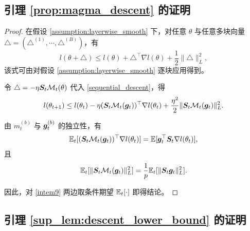 \documentclass[11pt, a4paper, twocolumn, copyright, goog]{google}
\theoremstyle{plain}
\theoremstyle{definition}
\theoremstyle{remark}
\begin{document}
\subsection{引理 \ref{prop:magma_descent} 的证明}
\begin{proof}
    
    在假设 \ref{assumption:layerwise_smooth} 下，对任意 $\theta$ 与任意多块向量 $\triangle = (\triangle^{(1)}, \cdots, \triangle^{(B)})$，有
    \begin{equation} \label{sequential_descent}
        l(\theta + \triangle) \leq l(\theta) + \triangle^\top \nabla l(\theta) + \frac{1}{2} \| \triangle \|_L^2,
    \end{equation}
    该式可由对假设 \ref{assumption:layerwise_smooth} 逐块应用得到。


    令 $\triangle = -\eta {\bm{S}}_t {\mathcal{M}}_t(\theta)$ 代入 \eqref{sequential_descent}，得
    \begin{equation} \label{intem9}
        l(\theta_{t+1})
            \leq l(\theta_t) - \eta ({\bm{S}}_t {\mathcal{M}}_t({\bm{g}}_t))^\top \nabla l(\theta_t) + \frac{\eta^2}{2} \| {\bm{S}}_t {\mathcal{M}}_t({\bm{g}}_t) \|_L^2.
    \end{equation}
    
    由 $m_{t}^{(b)}$ 与 ${\bm{g}}_t^{(b)}$ 的独立性，有 
    \begin{equation}
        \mathbb{E}_t [({\bm{S}}_t {\mathcal{M}}_t({\bm{g}}_t))^\top \nabla l(\theta_t)] = \mathbb{E} [{\bm{g}}_t^\top {\bm{S}}_t \nabla l(\theta_t)],
    \end{equation}
    且
    \begin{equation}
        \mathbb{E}_t [\| {\bm{S}}_t {\mathcal{M}}_t({\bm{g}}_t) \|_L^2] = \frac{1}{p} \mathbb{E}_t [\| {\bm{S}}_t {\bm{g}}_t \|_L^2].
    \end{equation}
    
    因此，对 \eqref{intem9} 两边取条件期望 $\mathbb{E}_t [\cdot]$ 即得结论。
\end{proof}


\subsection{引理 \ref{sup_lem:descent_lower_bound} 的证明}
\end{document}
